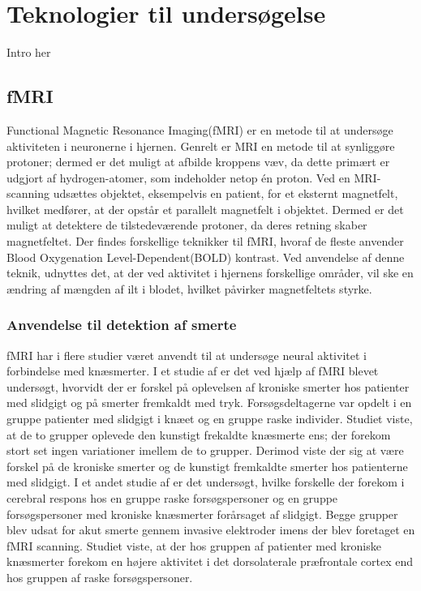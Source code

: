\section{Teknologier til undersøgelse} %
Intro her

\subsection{fMRI}
Functional Magnetic Resonance Imaging(fMRI) er en metode til at undersøge aktiviteten i neuronerne i hjernen.
Genrelt er MRI en metode til at synliggøre protoner; dermed er det muligt at afbilde kroppens væv, da dette primært er udgjort af hydrogen-atomer, som indeholder netop én proton.     
Ved en MRI-scanning udsættes objektet, eksempelvis en patient, for et eksternt magnetfelt, hvilket medfører, at der opstår et parallelt magnetfelt i objektet. Dermed er det muligt at detektere de tilstedeværende protoner, da deres retning skaber magnetfeltet.\citep{1}
Der findes forskellige teknikker til fMRI, hvoraf de fleste anvender Blood Oxygenation Level-Dependent(BOLD) kontrast. Ved anvendelse af denne teknik, udnyttes det, at der ved aktivitet i hjernens forskellige områder, vil ske en ændring af mængden af ilt i blodet, hvilket påvirker magnetfeltets styrke. \citep{1}

\subsubsection{Anvendelse til detektion af smerte}
fMRI har i flere studier været anvendt til at undersøge neural aktivitet i forbindelse med knæsmerter.
I et studie af \citep{3} er det ved hjælp af fMRI blevet undersøgt, hvorvidt der er forskel på oplevelsen af kroniske smerter hos patienter med slidgigt og på smerter fremkaldt med tryk. Forsøgsdeltagerne var opdelt i en gruppe patienter med slidgigt i knæet og en gruppe raske individer. Studiet viste, at de to grupper oplevede den kunstigt frekaldte knæsmerte ens; der forekom stort set ingen variationer imellem de to grupper. Derimod viste der sig at være forskel på de kroniske smerter og de kunstigt fremkaldte smerter hos patienterne med slidgigt. \citep{3} 
I et andet studie af \citep{2} er det undersøgt, hvilke forskelle der forekom i cerebral respons hos en gruppe raske forsøgspersoner og en gruppe forsøgspersoner med kroniske knæsmerter forårsaget af slidgigt. Begge grupper blev udsat for akut smerte gennem invasive elektroder imens der blev foretaget en fMRI scanning. Studiet viste, at der hos gruppen af patienter med kroniske knæsmerter forekom en højere aktivitet i det dorsolaterale præfrontale cortex end hos gruppen af raske forsøgspersoner. \citep{2} 

